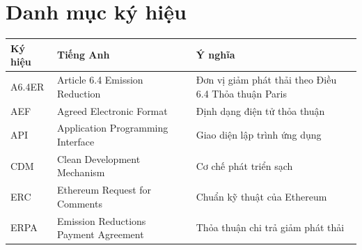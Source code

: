 \documentclass[a4paper,oneside]{report}
\begin{document}
\chapter*{Danh mục ký hiệu}
{}
\begin{longtable}{@{}p{2.4cm}p{5.4cm}p{6.3cm}@{}}
\toprule
\textbf{Ký hiệu} & \textbf{Tiếng Anh} & \textbf{Ý nghĩa} \\
\midrule
\endhead
\bottomrule
\endfoot
A6.4ER & Article 6.4 Emission Reduction           & Đơn vị giảm phát thải theo Điều 6.4 Thỏa thuận Paris \\
AEF    & Agreed Electronic Format                  & Định dạng điện tử thỏa thuận \\
API    & Application Programming Interface         & Giao diện lập trình ứng dụng \\
CDM    & Clean Development Mechanism               & Cơ chế phát triển sạch \\
ERC    & Ethereum Request for Comments             & Chuẩn kỹ thuật của Ethereum \\
ERPA   & Emission Reductions Payment Agreement     & Thỏa thuận chi trả giảm phát thải \\

\end{longtable}
\end{document}
